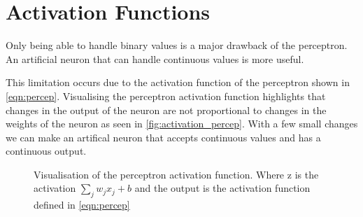 %
%

\section{Activation Functions}

Only being able to handle binary values is a major drawback of the perceptron. An artificial neuron that can handle continuous values is more useful.

This limitation occurs due to the activation function of the perceptron shown in \autoref{eqn:percep}. Visualising the perceptron activation function highlights that changes in the output of the neuron are not proportional to changes in the weights of the neuron as seen in \autoref{fig:activation_percep}. With a few small changes we can make an artifical neuron that accepts continuous values and has a continuous output.

\begin{figure}
\begin{center}
\caption{Visualisation of the perceptron activation function. Where z is the activation $\sum_{j} w_j x_j + b$ and the output is the activation function defined in \autoref{eqn:percep} }
\label{fig:activation_percep}
\end{center}
\end{figure}


